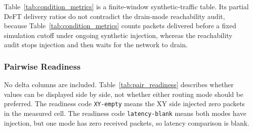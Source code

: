 \documentclass[conference]{IEEEtran}
\begin{document}
Table~\ref{tab:condition_metrics} is a finite-window synthetic-traffic table. Its partial DeFT delivery ratios do not contradict the drain-mode reachability audit, because Table~\ref{tab:condition_metrics} counts packets delivered before a fixed simulation cutoff under ongoing synthetic injection, whereas the reachability audit stops injection and then waits for the network to drain.

\subsubsection{Pairwise Readiness}

No delta columns are included. Table~\ref{tab:pair_readiness} describes whether values can be displayed side by side, not whether either routing mode should be preferred. The readiness code \texttt{XY-empty} means the XY side injected zero packets in the measured cell. The readiness code \texttt{latency-blank} means both modes have injection, but one mode has zero received packets, so latency comparison is blank.
\end{document}
